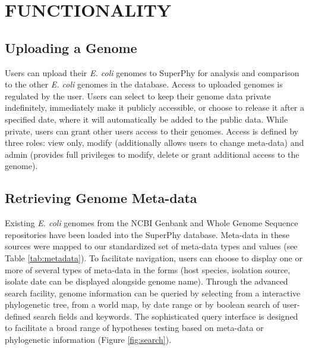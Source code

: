 \documentclass[a4paper,twoside]{article}
\begin{document}
\section{\uppercase{Functionality}}
\label{sec:functionality}

\subsection{Uploading a Genome}

Users can upload their \textit{E. coli} genomes to SuperPhy for analysis and comparison to the other \textit{E. coli} genomes in the database.  Access to uploaded genomes is regulated by the user. Users can select to keep their genome data private indefinitely, immediately make it publicly accessible, or choose to release it after a specified date, where it will automatically be added to the public data.  While private, users can grant other users access to their genomes.  Access is defined by three roles: view only, modify (additionally allows users to change meta-data) and admin (provides full privileges to modify, delete or grant additional access to the genome).

\subsection{Retrieving Genome Meta-data}

Existing \textit{E. coli} genomes from the NCBI Genbank and Whole Genome Sequence repositories \cite{benson2013genbank} have been loaded into the SuperPhy database. Meta-data in these sources were mapped to our standardized set of meta-data types and values (see Table \ref{tab:metadata}). To facilitate navigation,
users can choose to display one or more of several types of meta-data in the forms (host species, isolation source, isolate date can be displayed alongside genome name). Through the advanced search facility, genome information can be queried by selecting from a interactive phylogenetic tree, from a world map, by date range or by boolean search of user-defined search fields and keywords.  The sophisticated query interface is designed to facilitate a broad range of hypotheses testing based on meta-data or phylogenetic information (Figure \ref{fig:search}).

\begin{figure*}[t]
  \vspace{-0.2cm}
  \centering
   {}
  \caption{Advanced search function in SuperPhy. Genome information can be queried by (A) interactive phylogenetic tree (B) world map or (C) boolean search of user-specified fields and keywords. }
  \label{fig:search}
\end{figure*}
\end{document}
